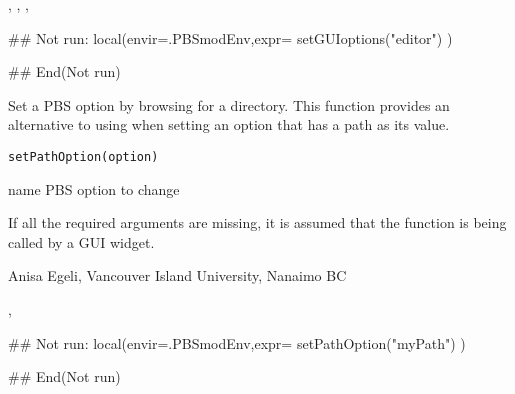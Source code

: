 \documentclass[letterpaper]{book}
\begin{document}
%
\begin{SeeAlso}\relax
{}, ,
,
\end{SeeAlso}
%
\begin{Examples}
\begin{ExampleCode}
## Not run: 
local(envir=.PBSmodEnv,expr={
  setGUIoptions("editor")
})

## End(Not run)
\end{ExampleCode}
\end{Examples}
%
\begin{Description}\relax
Set a PBS option by browsing for a directory. This function provides 
an alternative to using  when setting an option 
that has a path as its value.
\end{Description}
%
\begin{Usage}
\begin{verbatim}
setPathOption(option)
\end{verbatim}
\end{Usage}
%
\begin{Arguments}
\begin{ldescription}
\item[\code{option}] name PBS option to change
\end{ldescription}
\end{Arguments}
%
\begin{Note}\relax
If all the required arguments are missing, it is assumed that 
the function is being called by a GUI widget.
\end{Note}
%
\begin{Author}\relax
Anisa Egeli, Vancouver Island University, Nanaimo BC
\end{Author}
%
\begin{SeeAlso}\relax
{}, 
\end{SeeAlso}
%
\begin{Examples}
\begin{ExampleCode}
## Not run: 
local(envir=.PBSmodEnv,expr={
  setPathOption("myPath")
})

## End(Not run)
\end{ExampleCode}
\end{Examples}
\end{document}
